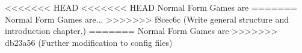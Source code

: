 
<<<<<<< HEAD
<<<<<<< HEAD
Normal Form Games are
=======
Normal Form Games are...
>>>>>>> f8cec6c (Write general structure and introduction chapter.)
=======
Normal Form Games are
>>>>>>> db23a56 (Further modification to config files)
